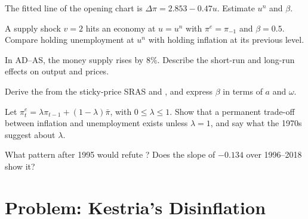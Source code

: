\begin{exercise}[$\star\star$]\label{exo:b1:aggregate-supply:estimate}
The fitted line of the opening chart is $\Delta\pi = 2.853 - 0.47u$. %
Estimate $u^n$ and $\beta$.
\end{exercise}

\begin{exercise}[$\star\star$]\label{exo:b1:aggregate-supply:supply}
A supply shock $v = 2$ hits an economy at $u = u^n$ with $\pi^e = \pi_{-1}$ and $\beta = 0.5$.
Compare holding unemployment at $u^n$ with holding inflation at its previous
level.
\end{exercise}

\begin{exercise}[$\star\star$]\label{exo:b1:aggregate-supply:demand}
In AD--AS, the money supply rises by $8\%$. Describe the short-run and
long-run effects on output and prices.
\end{exercise}

\begin{exercise}[$\star\star\star$]\label{exo:b1:aggregate-supply:derive}
Derive the  from the sticky-price SRAS
and , and express $\beta$ in terms of $a$ and $\omega$.
\end{exercise}

\begin{exercise}[$\star\star\star$]\label{exo:b1:aggregate-supply:lambda}
Let $\pi^e_t = \lambda\pi_{t-1} + (1 - \lambda)\bar\pi$, with $0 \le \lambda \le 1$. Show that a permanent trade-off between
inflation and unemployment exists unless $\lambda = 1$, and say what the 1970s
suggest about $\lambda$.
\end{exercise}

\begin{exercise}[$\star\star\star$]\label{exo:b1:aggregate-supply:refute}
What pattern after 1995 would refute ? Does the slope
of $-0.134$ over 1996--2018 show it? %
\end{exercise}

\section{Problem: Kestria's Disinflation}\label{sec:b1:aggregate-supply:problem}


